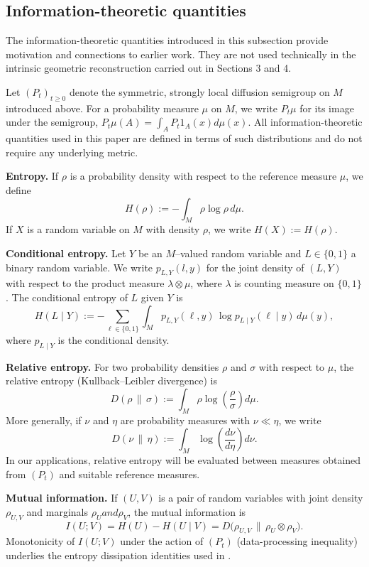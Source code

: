 \documentclass[11pt]{amsart}
\theoremstyle{definition}
\theoremstyle{remark}
\begin{document}
\subsection{Information-theoretic quantities}
The information-theoretic quantities introduced in this subsection provide
motivation and connections to earlier work.
They are not used technically in the intrinsic geometric reconstruction
carried out in Sections 3 and 4.


Let $(P_t)_{t\ge 0}$ denote the symmetric, strongly local diffusion semigroup on $M$ introduced
above. For a probability measure $\mu$ on $M$, we write $P_t \mu$ for its image under the semigroup, $P_t\mu(A) = \int_{A}P_t 1_{A}(x)d\mu(x).$
All information-theoretic quantities used in this paper are defined in terms of such distributions
and do not require any underlying metric.

\medskip
\noindent\textbf{Entropy.}
If $\rho$ is a probability density with respect to the reference measure $\mu$, we define
\[
H(\rho) := - \int_M \rho \log \rho \, d\mu.
\]
If $X$ is a random variable on $M$ with density $\rho$, we write $H(X):=H(\rho)$.

\medskip
\noindent\textbf{Conditional entropy.}
Let $Y$ be an $M$--valued random variable and $L\in\{0,1\}$ a binary random 
variable. We write $p_{L,Y}(l,y)$ for the joint density of $(L,Y)$ with 
respect to the product measure $\lambda \otimes \mu$, where $\lambda$ is 
counting measure on $\{0,1\}$. The conditional entropy of $L$ given $Y$ is
\[
H(L \mid Y)
:= - \sum_{\ell\in\{0,1\}} \int_M p_{L,Y}(\ell,y)\,
   \log p_{L \mid Y}(\ell \mid y)\, d\mu(y),
\]
where $p_{L\mid Y}$ is the conditional density.

\medskip
\noindent\textbf{Relative entropy.}
For two probability densities $\rho$ and $\sigma$ with respect to $\mu$, the relative entropy
(Kullback--Leibler divergence) \cite{CoverThomas2006} is
\[
D(\rho \,\|\, \sigma)
:= \int_M \rho \log\!\left(\frac{\rho}{\sigma}\right) d\mu.
\]
More generally, if $\nu$ and $\eta$ are probability measures with $\nu \ll \eta$, we write
\[
D(\nu \,\|\, \eta)
:= \int_M \log\!\left(\frac{d\nu}{d\eta}\right) d\nu.
\]
In our applications, relative entropy will be evaluated between measures obtained from $(P_t)$ and
suitable reference measures.

\medskip
\noindent\textbf{Mutual information.}
If $(U,V)$ is a pair of random variables with joint density $\rho_{U,V}$ and marginals
$\rho_U and \rho_V$, the mutual information \cite{CoverThomas2006} is
\[
I(U;V)
= H(U) - H(U\mid V)
= D\big(\rho_{U,V} \,\big\|\, \rho_U \otimes \rho_V\big).
\]
Monotonicity of $I(U;V)$ under the action of $(P_t)$ (data-processing inequality) underlies the
entropy dissipation identities used in \cite{Sangha2025Isoperimetry}.
\end{document}
